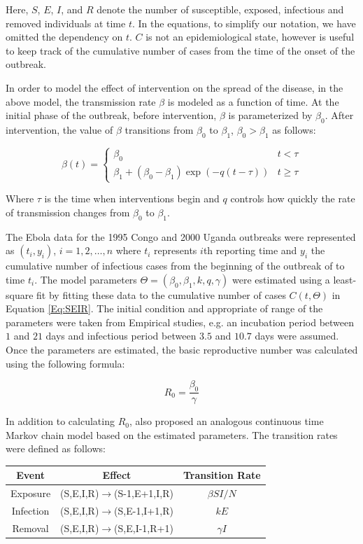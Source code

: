 \documentclass[10pt, journal,onecolumn]{IEEEtran}
\begin{document}
Here, $S$, $E$, $I$, and $R$ denote the number of susceptible, exposed, infectious and removed
individuals at time $t$. In the equations, to simplify our notation, we have omitted the dependency
on $t$. $C$ is not an epidemiological state, however is useful to keep track of the cumulative
number of cases from the time of the onset of the outbreak.

In order to model the effect of intervention on the spread of the disease, in the above model, the
transmission rate $\beta$ is modeled as a function of time. At the initial phase of the outbreak,
before intervention, $\beta$ is parameterized by $\beta_0$. After intervention, the value of
$\beta$ transitions from $\beta_0$ to $\beta_1$, $\beta_0>\beta_1$ as follows:

\[
\beta(t)=\begin{cases}
\beta_{0} & t<\tau\\
\beta_{1}+(\beta_{0}-\beta_{1})\exp\left(-q\left(t-\tau\right)\right) & t\ge\tau
\end{cases}
\]

Where $\tau$ is the time when interventions begin and $q$ controls how quickly the rate
of transmission changes from $\beta_0$ to $\beta_1$.

The Ebola data for the 1995 Congo and 2000 Uganda outbreaks were represented as $(t_i,y_i)$,
$i=1,2,\ldots,n$ where $t_i$ represents $i$th reporting time and $y_i$ the cumulative number of
infectious cases from the beginning of the outbreak of to time $t_i$.  The model parameters
$\Theta=(\beta_0,\beta_1,k,q,\gamma)$ were estimated using a least-square fit by fitting these data to
the cumulative number of cases $C(t,\Theta)$ in Equation \ref{Eq:SEIR}. The initial condition and
appropriate of range of the parameters were taken from Empirical studies, e.g. an incubation period
between $1$ and $21$ days and infectious period between $3.5$ and $10.7$ days were assumed. Once the
parameters are estimated, the basic reproductive number was calculated using the following formula:

\begin{equation}
R_0 = \dfrac{\beta_0}{\gamma}
\end{equation}


In addition to calculating $R_0$, \citep{chowell2004basic} also proposed an analogous continuous time Markov chain model based on the estimated parameters. The transition rates were defined as follows:

\begin{center}
\begin{tabular}{|c|c|c|}
\hline
Event & Effect & Transition Rate\tabularnewline
\hline
\hline
Exposure & (S,E,I,R)$\to$(S-1,E+1,I,R) & $\beta SI/N$\tabularnewline
\hline
Infection & (S,E,I,R)$\to$(S,E-1,I+1,R) & $kE$\tabularnewline
\hline
Removal & (S,E,I,R)$\to$(S,E,I-1,R+1) & $\gamma I$\tabularnewline
\hline
\end{tabular}
\end{center}
\end{document}
